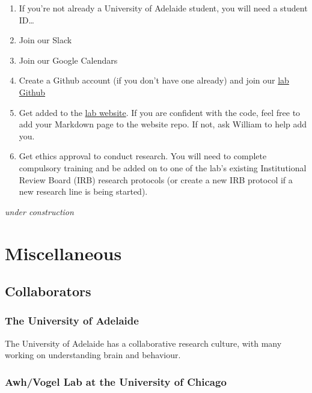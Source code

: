 \documentclass[
]{book}
\providecommand{\tightlist}{%
  \setlength{\itemsep}{0pt}\setlength{\parskip}{0pt}}
\begin{document}
\begin{enumerate}
\def\labelenumi{\arabic{enumi}.}
\tightlist
\item
  If you're not already a University of Adelaide student, you will need a student ID\ldots{}
\item
  Join our Slack
\item
  Join our Google Calendars
\item
  Create a Github account (if you don't have one already) and join our \href{https://github.com/PALM-Lab}{lab Github}
\item
  Get added to the \href{https://palm-lab.github.io}{lab website}. If you are confident with the code, feel free to add your Markdown page to the website repo. If not, ask William to help add you.
\item
  Get ethics approval to conduct research. You will need to complete compulsory training and be added on to one of the lab's existing Institutional Review Board (IRB) research protocols (or create a new IRB protocol if a new research line is being started).
\end{enumerate}

\emph{under construction}

\hypertarget{miscellaneous}{%
\chapter{Miscellaneous}\label{miscellaneous}}

\hypertarget{collaborators}{%
\section{Collaborators}\label{collaborators}}

\hypertarget{the-university-of-adelaide}{%
\subsection{The University of Adelaide}\label{the-university-of-adelaide}}

The University of Adelaide has a collaborative research culture, with many working on understanding brain and behaviour.

\hypertarget{awhvogel-lab-at-the-university-of-chicago}{%
\subsection{Awh/Vogel Lab at the University of Chicago}\label{awhvogel-lab-at-the-university-of-chicago}}
\end{document}
